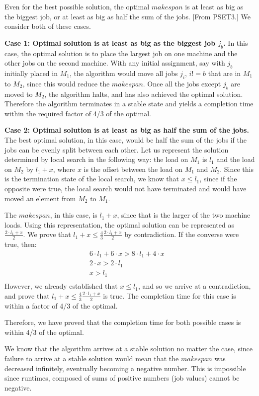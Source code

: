 \documentclass[11pt]{article}
\begin{document}
Even for the best possible solution, the optimal $makespan$ is at least as big as the biggest job, or at least as big as half the sum of the jobs. [From PSET3.] We consider both of these cases.
	
\textbf{Case 1: Optimal solution is at least as big as the biggest job $j_b$.}
In this case, the optimal solution is to place the largest job on one machine and the other jobs on the second machine. With any initial assignment, say with $j_b$ initially placed in $M_1$, the algorithm would move all jobs $j_i$, $i!=b$ that are in $M_1$ to $M_2$, since this would reduce the $makespan$. Once all the jobs except $j_b$ are moved to $M_2$, the algorithm halts, and has also achieved the optimal solution. Therefore the algorithm terminates in a stable state and yields a completion time within the required factor of 4/3 of the optimal.

\textbf{Case 2: Optimal solution is at least as big as half the sum of the jobs.}
The best optimal solution, in this case, would be half the sum of the jobs if the jobs can be evenly split between each other. Let us represent the solution determined by local search in the following way: the load on $M_1$ is $l_1$ and the load on $M_2$ by $l_1 + x$, where $x$ is the offset between the load on $M_1$ and $M_2$. Since this is the termination state of the local search, we know that $x \leq l_1$, since if the opposite were true, the local search would not have terminated and would have moved an element from $M_2$ to $M_1$.

The $makespan$, in this case, is $l_1 + x$, since that is the larger of the two machine loads. Using this representation, the optimal solution can be represented as $\frac{2 \cdot l_1 + x}{2}$. We prove that $l_1 + x \leq \frac{4}{3}\frac{2 \cdot l_1 + x}{2}$ by contradiction. If the converse were true, then:
\begin{align*}
	6 \cdot l_1 + 6 \cdot x > 8 \cdot l_1 + 4 \cdot x &\\
	2\cdot x > 2 \cdot l_1 & \\
	x > l_1 & \\
\end{align*}
However, we already established that $x \leq l_1$, and so we arrive at a contradiction, and prove that $l_1 + x \leq \frac{4}{3}\frac{2 \cdot l_1 + x}{2}$ is true. The completion time for this case is within a factor of 4/3 of the optimal.

Therefore, we have proved that the completion time for both possible cases is within 4/3 of the optimal.

We know that the algorithm arrives at a stable solution no matter the case, since failure to arrive at a stable solution would mean that the $makespan$ was decreased infinitely, eventually becoming a negative number. This is impossible since runtimes, composed of sums of positive numbers (job values) cannot be negative.
\end{document}
